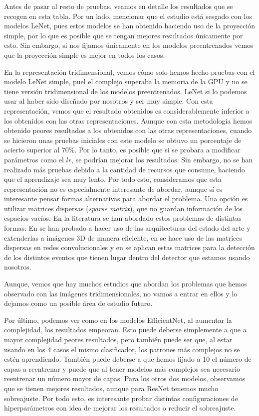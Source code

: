 \documentclass[a4paper,12pt,oneside,titlepage]{book}
\begin{document}
Antes de pasar al resto de pruebas, veamos en detalle los resultados que se recogen en esta tabla. Por un lado, mencionar que el estudio está sesgado con los modelos LeNet, pues estos modelos se han obtenido haciendo uso de la proyección simple, por lo que es posible que se tengan mejores resultados únicamente por esto. Sin embargo, si nos fijamos únicamente en los modelos preentrenados vemos que la proyección simple es mejor en todos los casos.
 
En la representación tridimensional, vemos cómo solo hemos hecho pruebas con el modelo LeNet simple, puel el complejo superaba la memoria de la GPU y no se tiene versión tridimensional de los modelos preentrenados. LeNet si lo podemos usar al haber sido diseñado por nosotros y ser muy simple. Con esta representación, vemos que el resultado obtenidos es considerablemente inferior a los obtenidos con las otras representaciones. Aunque con esta metodología hemos obtenido peores resultados a los obtenidos con las otras representaciones, cuando se hicieron unas pruebas iniciales con este modelo se obtuvo un porcentaje de acierto superior al 70\%. Por lo tanto, es posible que si se probara a modificar parámetros como el $lr$, se podrían mejorar los resultados. Sin embargo, no se han realizado más pruebas debido a la cantidad de recursos que consume, haciendo que el aprendizaje sea muy lento. Por todo esto, consideramos que esta representación no es especialmente interesante de abordar, aunque sí es interesante pensar formas alternativas para abordar el problema. Una opción es utilizar matrices dispersas (\textit{sparse matrix}), que no guardan información de los espacios vacíos. En la literatura se han abordado estos problemas de distintas formas: En \cite{3d_1} se han probado a hacer uso de las arquitecturas del estado del arte y extenderlas a imágenes 3D de manera eficiente, en \cite{3d_sparse} se hace uso de las matrices dispersas en redes convolucionales y en \cite{sparse_neutrino} se aplican estas matrices para la detección de los distintos eventos que tienen lugar dentro del detector que estamos usando nosotros.
 
Aunque, vemos que hay muchos estudios que abordan los problemas que hemos observado con las imágenes tridimensionales, no vamos a entrar en ellos y lo dejamos como un posible área de estudio futuro.
 
Por último, podemos ver como en los modelos EfficientNet, al aumentar la complejidad, los resultados empeoran. Esto puede deberse simplemente a que a mayor complejidad peores resultados, pero también puede ser que, al estar usando en los 4 casos el mismo clasificador, los patrones más complejos no se estén aprendiendo. También puede deberse a que hemos fijado a 10 el número de capas a reentrenar y puede que al tener modelos más complejos sea necesario reentrenar un número mayor de capas. Para los otros dos modelos, observamos que se tienen mejores resultados, aunque para ResNet tenemos mucho sobreajuste. Por todo esto, es interesante probar distintas configuraciones de hiperparámetros con idea de mejorar los resultados o reducir el sobreajuste. 
\end{document}
